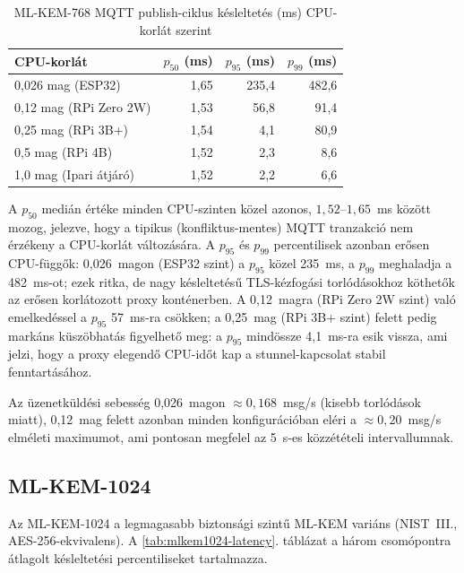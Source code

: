 \begin{table}[ht]
\centering
\caption{ML-KEM-768 MQTT publish-ciklus késleltetés (ms) CPU-korlát szerint}
\label{tab:mlkem-latency}
\begin{tabular}{lrrr}
\hline
\textbf{CPU-korlát} & \textbf{$p_{50}$ (ms)} & \textbf{$p_{95}$ (ms)} & \textbf{$p_{99}$ (ms)} \\
\hline
0,026 mag (ESP32)        & 1,65 & 235,4 & 482,6 \\
0,12 mag (RPi Zero 2W)  & 1,53 &  56,8 &  91,4 \\
0,25 mag (RPi 3B+)      & 1,54 &   4,1 &  80,9 \\
0,5 mag (RPi 4B)        & 1,52 &   2,3 &   8,6 \\
1,0 mag (Ipari átjáró)  & 1,52 &   2,2 &   6,6 \\
\hline
\end{tabular}
\end{table}

A $p_{50}$ medián értéke minden CPU-szinten közel azonos, $1{,}52$--$1{,}65$~ms között
mozog, jelezve, hogy a tipikus (konfliktus-mentes) MQTT tranzakció nem érzékeny a
CPU-korlát változására. A $p_{95}$ és $p_{99}$ percentilisek azonban erősen CPU-függők:
0,026~magon (ESP32 szint) a $p_{95}$ közel 235~ms, a $p_{99}$ meghaladja a 482~ms-ot;
ezek ritka, de nagy késleltetésű TLS-kézfogási torlódásokhoz köthetők az erősen
korlátozott proxy konténerben. A 0,12~magra (RPi Zero 2W szint) való emelkedéssel a $p_{95}$
57~ms-ra csökken; a 0,25~mag (RPi 3B+ szint) felett pedig markáns küszöbhatás figyelhető
meg: a $p_{95}$ mindössze 4,1~ms-ra esik vissza, ami jelzi, hogy a proxy elegendő CPU-időt
kap a stunnel-kapcsolat stabil fenntartásához.

Az üzenetküldési sebesség 0,026~magon $\approx 0{,}168$~msg/s (kisebb torlódások miatt),
0,12~mag felett azonban minden konfigurációban eléri a $\approx 0{,}20$~msg/s elméleti
maximumot, ami pontosan megfelel az 5~s-es közzétételi intervallumnak.

\subsection{ML-KEM-1024}

Az ML-KEM-1024 a legmagasabb biztonsági szintű ML-KEM variáns (NIST~III., AES-256-ekvivalens).
A \ref{tab:mlkem1024-latency}. táblázat a három csomópontra átlagolt késleltetési
percentiliseket tartalmazza.

